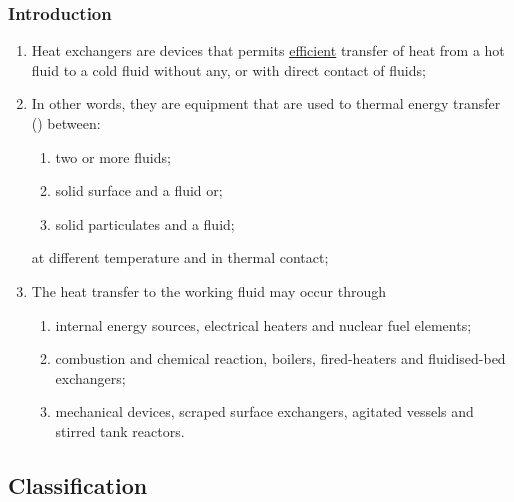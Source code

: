 \documentclass[10pt,compress,unknownkeysallowed]{beamer}
\begin{document}
\begin{frame}
 \frametitle{Introduction}
    \begin{enumerate}%
        \item<1-> Heat exchangers are devices that permits \underline{efficient} transfer of heat from a hot fluid to a cold fluid without any, or with direct contact of fluids;
        \item<2-> In other words, they are equipment that are used to thermal energy transfer (\ie {}) between:
            \begin{enumerate}%
               \item<2-> two or more fluids;
               \item<2-> solid surface and a fluid or;
               \item<2-> solid particulates and a fluid;
            \end{enumerate}
            at different temperature and in thermal contact;
       \item<3-> The heat transfer to the working fluid may occur through
            \begin{enumerate}%
               \item<3-> internal energy sources, \eg electrical heaters and nuclear fuel elements;
               \item<3-> combustion and chemical reaction, \eg boilers, fired-heaters and fluidised-bed exchangers;
               \item<3-> mechanical devices, \eg scraped surface exchangers, agitated vessels and stirred tank reactors.
            \end{enumerate}
   \end{enumerate}
\end{frame}


\subsection{Classification}
\end{document}
